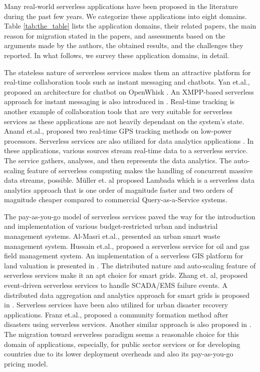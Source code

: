 \label{Sec:application}
Many real-world serverless applications have been proposed in the literature during the past few years. We categorize these applications into eight domains. Table \ref{tab:the_table} lists the application domains, their related papers, the main reason for migration stated in the papers, and assessments based on the arguments made by the authors, the obtained results, and the challenges they reported. In what follows, we survey these application domains, in detail.

The stateless nature of serverless services makes them an attractive platform for real-time collaboration tools such as instant messaging and chatbots. Yan et.al.,  proposed an architecture for chatbot on OpenWhisk . An XMPP-based serverless approach for instant messaging is also introduced in . Real-time tracking is another example of collaboration tools that are very suitable for serverless services as these applications are not heavily dependant on the system's state. Anand et.al.,  proposed two real-time GPS tracking methods on low-power processors.
Serverless services are also utilized for data analytics applications . In these applications, various sources stream real-time data to a serverless service. The service gathers, analyses, and then represents the data analytics. The auto-scaling feature of serverless computing makes the handling of concurrent massive data streams, possible.  Müller et. al  proposed Lambada which is a serverless data analytics approach that is one order of magnitude faster and two orders of magnitude cheaper compared to commercial Query-as-a-Service systems.

The pay-as-you-go model of serverless services paved the way for the introduction and implementation of various budget-restricted urban and industrial management systems.  Al-Masri et.al.,  presented an urban smart waste management system. Hussain et.al.,  proposed a serverless service for oil and gas field management system. An implementation of a serverless GIS platform for land valuation is presented in . 
The distributed nature and auto-scaling feature of serverless services make it an apt choice for smart grids. Zhang et. al,   proposed event-driven serverless services to handle SCADA/EMS failure events. A distributed data aggregation and analytics approach for smart grids is proposed in . Serverless services have been also utilized for urban disaster recovery applications. Franz et.al.,  proposed a community formation method after disasters using serverless services. Another similar approach is also proposed in . 
The migration toward serverless paradigm seems a reasonable choice for this domain of applications, especially, for public sector services or for developing countries due to its lower deployment overheads and also its pay-as-you-go pricing model.

